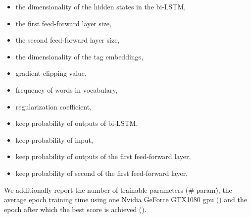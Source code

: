 \documentclass[11pt,letterpaper]{article}
\begin{document}
\begin{itemize}
\item the dimensionality of the hidden states in the bi-LSTM,  
\item the first feed-forward layer size, 
\item the second feed-forward layer size,  
\item the dimensionality of the tag embeddings, 
\item gradient clipping value, 
\item frequency of words in vocabulary,  
\item regularization coefficient,  
\item keep probability of outputs of bi-LSTM,  
\item keep probability of input, 
\item keep probability of outputs of the first feed-forward layer, 
\item keep probability of second of the first feed-forward layer, 
\end{itemize}

We additionally report the number of trainable parameters (\# param\.), the average epoch training time using one Nvidia GeForce GTX1080 gpu () and the epoch after which the best score is achieved ().

 	
\end{document}
